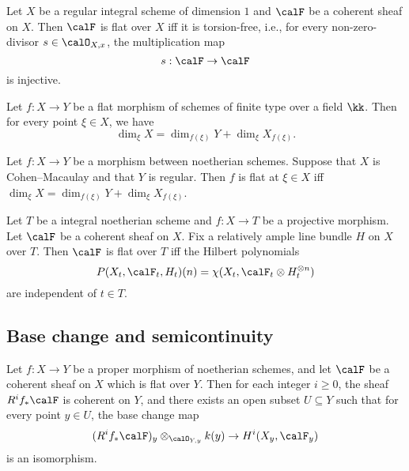     \begin{proposition}\label{prop:flat_over_curve_iff_torsion_free}
        Let \(X\) be a regular integral scheme of dimension \(1\) and \(\calF\) be a coherent sheaf on \(X\).
        Then \(\calF\) is flat over \(X\) iff it is torsion-free, i.e., for every non-zero-divisor \(s \in \calO_{X,x}\), the multiplication map
        \[
            s:\calF\to\calF
        \]
        is injective.
    \end{proposition}

    \begin{proposition}\label{prop:flat_and_equi_dimensional_fiber}
        Let \(f:X \to Y\) be a flat morphism of schemes of finite type over a field \(\kk\).
        Then for every point \(\xi \in X\), we have
        \[ \dim_\xi X = \dim_{f(\xi)} Y + \dim_\xi X_{f(\xi)}. \]
    \end{proposition}

    \begin{theorem}\label{thm:Miracle_flatness}
        Let \(f:X\to Y\) be a morphism between noetherian schemes.
        Suppose that \(X\) is Cohen--Macaulay and that \(Y\) is regular.
        Then \(f\) is flat at \(\xi \in X\) iff \(\dim_\xi X = \dim_{f(\xi)} Y + \dim_\xi X_{f(\xi)}\).
    \end{theorem}

    \begin{theorem}\label{thm:flat_iff_has_the_same_Hilbert_polynomials}
        Let \(T\) be a integral noetherian scheme and \(f:X\to T\) be a projective morphism.
        Let \(\calF\) be a coherent sheaf on \(X\).
        Fix a relatively ample line bundle \(H\) on \(X\) over \(T\).
        Then \(\calF\) is flat over \(T\) iff the Hilbert polynomials 
        \[
            P(X_t,\calF_t,H_t)(n) = \chi(X_t,\calF_t \otimes H_t^{\otimes n})
        \]
        are independent of \(t \in T\).
    \end{theorem}



\subsection{Base change and semicontinuity}

    \begin{theorem}\label{thm:Grauert_theorem}
        Let \(f:X\to Y\) be a proper morphism of noetherian schemes, and let \(\calF\) be a coherent sheaf on \(X\) which is flat over \(Y\).
        Then for each integer \(i\geq 0\), the sheaf \(R^i f_* \calF\) is coherent on \(Y\), and there exists an open subset \(U \subseteq Y\) such that for every point \(y \in U\), the base change map
        \[
            (R^i f_* \calF)_y \otimes_{\calO_{Y,y}} k(y) \to H^i(X_y,\calF_y)
        \]
        is an isomorphism.
    \end{theorem}

